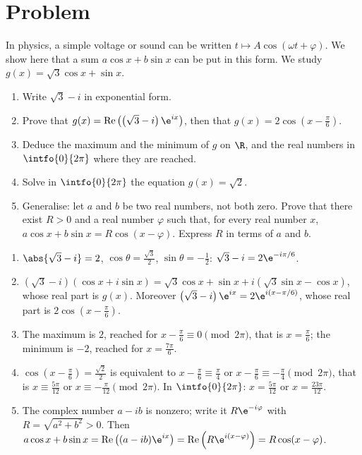 \section{Problem}
\begin{problem}
In physics, a simple voltage or sound can be written $t\mapsto A\cos(\omega t+\varphi)$. We show here that a sum $a\cos x+b\sin x$ can be put in this form. We study $g(x)=\sqrt3\cos x+\sin x$.
\begin{enumerate}
\item Write $\sqrt3-i$ in exponential form.
\item Prove that $g(x)=\operatorname{Re}\left(\left(\sqrt3-i\right)\e^{ix}\right)$, then that $g(x)=2\cos\left(x-\frac\pi6\right)$.
\item Deduce the maximum and the minimum of $g$ on $\R$, and the real numbers in $\intfo{0}{2\pi}$ where they are reached.
\item Solve in $\intfo{0}{2\pi}$ the equation $g(x)=\sqrt2$.
\item Generalise: let $a$ and $b$ be two real numbers, not both zero. Prove that there exist $R>0$ and a real number $\varphi$ such that, for every real number $x$, $a\cos x+b\sin x=R\cos(x-\varphi)$. Express $R$ in terms of $a$ and $b$.
\end{enumerate}
\end{problem}
\begin{solution}[Problem]
\begin{enumerate}
\item $\abs{\sqrt3-i}=2$, $\cos\theta=\frac{\sqrt3}2$, $\sin\theta=-\frac12$: $\sqrt3-i=2\e^{-i\pi/6}$.
\item $\left(\sqrt3-i\right)(\cos x+i\sin x)=\sqrt3\cos x+\sin x+i\left(\sqrt3\sin x-\cos x\right)$, whose real part is $g(x)$. Moreover $\left(\sqrt3-i\right)\e^{ix}=2\e^{i(x-\pi/6)}$, whose real part is $2\cos\left(x-\frac\pi6\right)$.
\item The maximum is $2$, reached for $x-\frac\pi6\equiv0\pmod{2\pi}$, that is $x=\frac\pi6$; the minimum is $-2$, reached for $x=\frac{7\pi}6$.
\item $\cos\left(x-\frac\pi6\right)=\frac{\sqrt2}2$ is equivalent to $x-\frac\pi6\equiv\frac\pi4$ or $x-\frac\pi6\equiv-\frac\pi4\pmod{2\pi}$, that is $x\equiv\frac{5\pi}{12}$ or $x\equiv-\frac\pi{12}\pmod{2\pi}$. In $\intfo{0}{2\pi}$: $x=\frac{5\pi}{12}$ or $x=\frac{23\pi}{12}$.
\item The complex number $a-ib$ is nonzero; write it $R\e^{-i\varphi}$ with $R=\sqrt{a^2+b^2}>0$. Then $a\cos x+b\sin x=\operatorname{Re}\left((a-ib)\e^{ix}\right)=\operatorname{Re}\left(R\e^{i(x-\varphi)}\right)=R\cos(x-\varphi)$.
\end{enumerate}
\end{solution}
